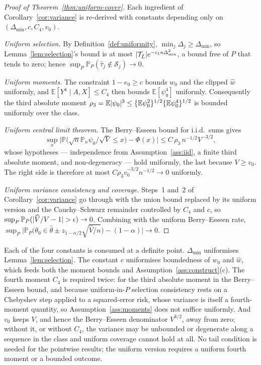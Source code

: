 \documentclass[11pt]{article}
\theoremstyle{plain}
\theoremstyle{definition}
\theoremstyle{remark}
\newcommand{\E}{\mathbb{E}}
\newcommand{\PP}{\mathbb{P}}
\newcommand{\Pn}{\mathbb{P}_n}
\newcommand{\cT}{\mathcal{T}}
\newcommand{\cS}{\mathcal{S}}
\newcommand{\ez}{e_0}
\newcommand{\wz}{w_0}
\newcommand{\what}{\widehat{w}}
\newcommand{\that}{\widehat{\tau}}
\newcommand{\thetahat}{\widehat{\theta}}
\newcommand{\Vhat}{\widehat{V}}
\DeclarePairedDelimiter{\abs}{\lvert}{\rvert}
\DeclarePairedDelimiter{\card}{\lvert}{\rvert}
\begin{document}
\begin{proof}[Proof of Theorem~\ref{thm:uniform-cover}]
Each ingredient of Corollary~\ref{cor:variance} is re-derived with constants
depending only on $(\Delta_{\min},c,C_4,v_0)$.

\emph{Uniform selection.} By Definition~\ref{def:uniformity},
$\min_j\Delta_j\ge\Delta_{\min}$, so Lemma~\ref{lem:selection}'s bound is at most
$\card{\cT_{\bar L}}e^{-c_1n\Delta_{\min}^2}$, a bound free of $P$ that tends to
zero; hence $\sup_P\PP_P(\that_j\notin\cS_j)\to0$.

\emph{Uniform moments.} The constraint $1-\ez\ge c$ bounds $\wz$ and the clipped
$\what$ uniformly, and $\E[Y^4\mid A,X]\le C_4$ then bounds $\E[\psi_0^4]$
uniformly. Consequently the third absolute moment
$\rho_3=\E\abs{\psi_0}^3\le\{\E\psi_0^2\}^{1/2}\{\E\psi_0^4\}^{1/2}$ is bounded
uniformly over the class.

\emph{Uniform central limit theorem.} The Berry--Esseen bound for i.i.d.\ sums
gives
\[
  \sup_x\bigl\lvert\PP\bigl(\sqrt n\Pn\psi_0/\sqrt V\le x\bigr)-\Phi(x)\bigr\rvert
  \le C\,\rho_3\,n^{-1/2}V^{-3/2},
\]
whose hypotheses --- independence from Assumption~\ref{ass:iid}, a finite third
absolute moment, and non-degeneracy --- hold uniformly, the last because
$V\ge v_0$. The right side is therefore at most $C\rho_3v_0^{-3/2}n^{-1/2}\to0$
uniformly.

\emph{Uniform variance consistency and coverage.} Steps~1 and~2 of
Corollary~\ref{cor:variance} go through with the union bound replaced by its
uniform version and the Cauchy--Schwarz remainder controlled by $C_4$ and $c$, so
$\sup_P\PP_P(\abs{\Vhat/V-1}>\epsilon)\to0$. Combining with the uniform
Berry--Esseen rate,
$\sup_P\bigl\lvert\PP_P\bigl(\theta_0\in\thetahat\pm
z_{1-\alpha/2}\sqrt{\Vhat/n}\bigr)-(1-\alpha)\bigr\rvert\to0$.
\end{proof}

\noindent Each of the four constants is consumed at a definite point.
$\Delta_{\min}$ uniformises Lemma~\ref{lem:selection}. The constant $c$
uniformises boundedness of $\wz$ and $\what$, which feeds both the moment bounds
and Assumption~\ref{ass:construct}(c). The fourth moment $C_4$ is required twice:
for the third absolute moment in the Berry--Esseen bound, and because
uniform-in-$P$ selection consistency rests on a Chebyshev step applied to a
squared-error risk, whose variance is itself a fourth-moment quantity, so
Assumption~\ref{ass:moments} does not suffice uniformly. And $v_0$ keeps $V$, and
hence the Berry--Esseen denominator $V^{3/2}$, away from zero; without it, or
without $C_4$, the variance may be unbounded or degenerate along a sequence in
the class and uniform coverage cannot hold at all. No tail condition is needed
for the pointwise results; the uniform version requires a uniform fourth moment
or a bounded outcome.
\end{document}
